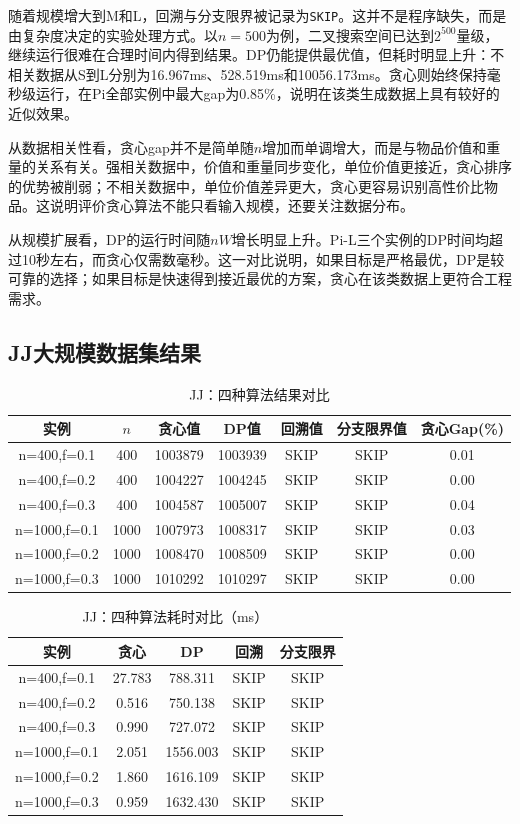 \documentclass[10.5pt,a4paper,fontset=none]{ctexart}
\begin{document}
随着规模增大到M和L，回溯与分支限界被记录为\texttt{SKIP}。这并不是程序缺失，而是由复杂度决定的实验处理方式。以$n=500$为例，二叉搜索空间已达到$2^{500}$量级，继续运行很难在合理时间内得到结果。DP仍能提供最优值，但耗时明显上升：不相关数据从S到L分别为16.967ms、528.519ms和10056.173ms。贪心则始终保持毫秒级运行，在Pi全部实例中最大gap为0.85\%，说明在该类生成数据上具有较好的近似效果。

从数据相关性看，贪心gap并不是简单随$n$增加而单调增大，而是与物品价值和重量的关系有关。强相关数据中，价值和重量同步变化，单位价值更接近，贪心排序的优势被削弱；不相关数据中，单位价值差异更大，贪心更容易识别高性价比物品。这说明评价贪心算法不能只看输入规模，还要关注数据分布。

从规模扩展看，DP的运行时间随$nW$增长明显上升。Pi-L三个实例的DP时间均超过10秒左右，而贪心仅需数毫秒。这一对比说明，如果目标是严格最优，DP是较可靠的选择；如果目标是快速得到接近最优的方案，贪心在该类数据上更符合工程需求。

\FloatBarrier

\subsection{JJ大规模数据集结果}

\begin{table}[!htbp]
\centering
\footnotesize
\caption{JJ：四种算法结果对比}
\begin{tabular}{ccccccc}
\toprule
实例 & $n$ & 贪心值 & DP值 & 回溯值 & 分支限界值 & 贪心Gap(\%) \\
\midrule
n=400,f=0.1 & 400 & 1003879 & 1003939 & SKIP & SKIP & 0.01 \\
n=400,f=0.2 & 400 & 1004227 & 1004245 & SKIP & SKIP & 0.00 \\
n=400,f=0.3 & 400 & 1004587 & 1005007 & SKIP & SKIP & 0.04 \\
n=1000,f=0.1 & 1000 & 1007973 & 1008317 & SKIP & SKIP & 0.03 \\
n=1000,f=0.2 & 1000 & 1008470 & 1008509 & SKIP & SKIP & 0.00 \\
n=1000,f=0.3 & 1000 & 1010292 & 1010297 & SKIP & SKIP & 0.00 \\
\bottomrule
\end{tabular}
\end{table}

\begin{table}[!htbp]
\centering
\footnotesize
\caption{JJ：四种算法耗时对比（ms）}
\begin{tabular}{ccccc}
\toprule
实例 & 贪心 & DP & 回溯 & 分支限界 \\
\midrule
n=400,f=0.1 & 27.783 & 788.311 & SKIP & SKIP \\
n=400,f=0.2 & 0.516 & 750.138 & SKIP & SKIP \\
n=400,f=0.3 & 0.990 & 727.072 & SKIP & SKIP \\
n=1000,f=0.1 & 2.051 & 1556.003 & SKIP & SKIP \\
n=1000,f=0.2 & 1.860 & 1616.109 & SKIP & SKIP \\
n=1000,f=0.3 & 0.959 & 1632.430 & SKIP & SKIP \\
\bottomrule
\end{tabular}
\end{table}
\end{document}
